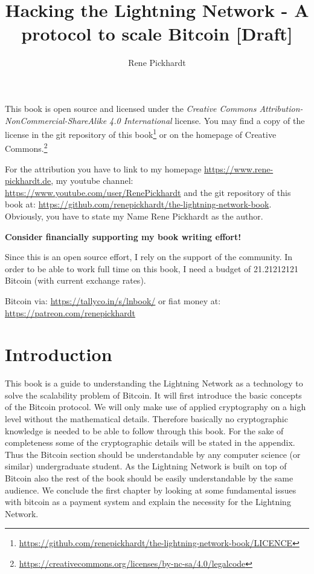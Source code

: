 \documentclass[ebook,12pt,oneside,openany]{memoir}
\title{Hacking the Lightning Network - A protocol to scale Bitcoin [Draft]}
\author{Rene Pickhardt}
\begin{document}
\maketitle

\newpage
This book is open source and licensed under the \textit{Creative Commons Attribution-NonCommercial-ShareAlike 4.0 International} license. You may find a copy of the license in the git repository of this book\footnote{\url{https://github.com/renepickhardt/the-lightning-network-book/LICENCE}} or on the homepage of Creative Commons.\footnote{\url{https://creativecommons.org/licenses/by-nc-sa/4.0/legalcode}}

For the attribution you have to link to my homepage \url{https://www.rene-pickhardt.de}, my youtube channel: \url{https://www.youtube.com/user/RenePickhardt} and the git repository of this book at: \url{https://github.com/renepickhardt/the-lightning-network-book}. Obviously, you have to state my Name Rene Pickhardt as the author.

\textbf{Consider financially supporting my book writing effort!}

Since this is an open source effort, I rely on the support of the community. In order to be able to work full time on this book, I need a budget of 21.21212121 Bitcoin (with current exchange rates).

Bitcoin via: \url{https://tallyco.in/s/lnbook/} or fiat money at:  \url{https://patreon.com/renepickhardt}


\newpage
\tableofcontents
\newpage

\chapter{Introduction}
This book is a guide to understanding the Lightning Network as a technology to solve the scalability problem of Bitcoin.
It will first introduce the basic concepts of the Bitcoin protocol.
We will only make use of applied cryptography on a high level without the mathematical details.
Therefore basically no cryptographic knowledge is needed to be able to follow through this book.
For the sake of completeness some of the cryptographic details will be stated in the appendix.
Thus the Bitcoin section should be understandable by any computer science (or similar) undergraduate student.
As the Lightning Network is built on top of Bitcoin also the rest of the book should be easily understandable by the same audience.
We conclude the first chapter by looking at some fundamental issues with bitcoin as a payment system and explain the necessity for the Lightning Network.
\end{document}
